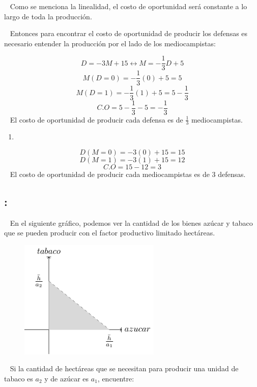 \documentclass[
  letterpaper,
  DIV=11,
  numbers=noendperiod]{scrreport}
\providecommand{\tightlist}{%
  \setlength{\itemsep}{0pt}\setlength{\parskip}{0pt}}\usepackage{longtable,booktabs,array}
\begin{document}
~ Como se menciona la linealidad, el costo de oportunidad será constante
a lo largo de toda la producción.

~ Entonces para encontrar el costo de oportunidad de producir los
defensas es necesario entender la producción por el lado de los
mediocampistas:

\[D=-3M+15 \leftrightarrow M=-\frac{1}{3}D+5\]
\[M(D=0)=-\frac{1}{3}(0)+5=5\]
\[M(D=1)=-\frac{1}{3}(1)+5=5-\frac{1}{3}\]
\[C.O = 5-\frac{1}{3} - 5= -\frac{1}{3}\] ~ El costo de oportunidad de
producir cada defensa es de \(\frac{1}{3}\) mediocampistas.

\begin{enumerate}
\def\labelenumi{\alph{enumi})}
\setcounter{enumi}{3}
\tightlist
\item
\end{enumerate}

\[D(M=0)=-3(0)+15=15\] \[D(M=1)=-3(1)+15=12\] \[C.O=15-12=3\] ~ El costo
de oportunidad de producir cada mediocampistas es de 3 defensas.

\hypertarget{section-5}{%
\subsection{:}\label{section-5}}

~ En el siguiente gráfico, podemos ver la cantidad de los bienes azúcar
y tabaco que se pueden producir con el factor productivo limitado
hectáreas.

\begin{figure}

{\centering \includegraphics[width=0.6\textwidth,height=\textheight]{7,8titulo_files/figure-pdf/unnamed-chunk-10-1.pdf}

}

\end{figure}

~ Si la cantidad de hectáreas que se necesitan para producir una unidad
de tabaco es \(a_2\) y de azúcar es \(a_1\), encuentre:
\end{document}
